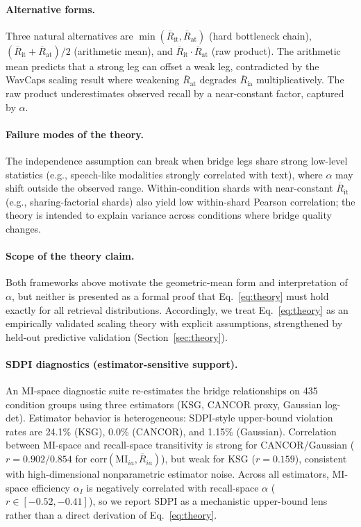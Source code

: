 \documentclass{article}
\newcommand{\avgR}{\overline{R}}
\begin{document}
\paragraph{Alternative forms.}
Three natural alternatives are $\min(\avgR_\mathrm{it}, \avgR_\mathrm{at})$ (hard bottleneck chain),
$(\avgR_\mathrm{it}+\avgR_\mathrm{at})/2$ (arithmetic mean), and
$\avgR_\mathrm{it}\cdot\avgR_\mathrm{at}$ (raw product).
The arithmetic mean predicts that a strong leg can offset a weak leg, contradicted by the WavCaps scaling result where weakening $\avgR_\mathrm{at}$ degrades $\avgR_\mathrm{ia}$ multiplicatively.
The raw product underestimates observed recall by a near-constant factor, captured by $\alpha$.

\paragraph{Failure modes of the theory.}
The independence assumption can break when bridge legs share strong low-level statistics (e.g., speech-like modalities strongly correlated with text), where $\alpha$ may shift outside the observed range.
Within-condition shards with near-constant $\avgR_\mathrm{it}$ (e.g., sharing-factorial shards) also yield low within-shard Pearson correlation; the theory is intended to explain variance across conditions where bridge quality changes.

\paragraph{Scope of the theory claim.}
Both frameworks above motivate the geometric-mean form and interpretation of $\alpha$, but neither is presented as a formal proof that Eq.~\ref{eq:theory} must hold exactly for all retrieval distributions.
Accordingly, we treat Eq.~\ref{eq:theory} as an empirically validated scaling theory with explicit assumptions, strengthened by held-out predictive validation (Section~\ref{sec:theory}).

\paragraph{SDPI diagnostics (estimator-sensitive support).}
An MI-space diagnostic suite re-estimates the bridge relationships on 435 condition groups using three estimators (KSG, CANCOR proxy, Gaussian log-det).
Estimator behavior is heterogeneous: SDPI-style upper-bound violation rates are 24.1\% (KSG), 0.0\% (CANCOR), and 1.15\% (Gaussian).
Correlation between MI-space and recall-space transitivity is strong for CANCOR/Gaussian ($r=0.902/0.854$ for $\mathrm{corr}(\mathrm{MI}_{ia},\avgR_{ia})$), but weak for KSG ($r=0.159$), consistent with high-dimensional nonparametric estimator noise.
Across all estimators, MI-space efficiency $\alpha_I$ is negatively correlated with recall-space $\alpha$ ($r \in [-0.52,-0.41]$), so we report SDPI as a mechanistic upper-bound lens rather than a direct derivation of Eq.~\ref{eq:theory}.
\end{document}
